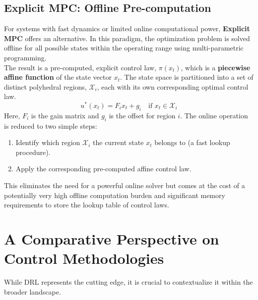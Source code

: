 \subsection{Explicit MPC: Offline Pre-computation}
For systems with fast dynamics or limited online computational power, \textbf{Explicit MPC} offers an alternative. In this paradigm, the optimization problem is solved offline for all possible states within the operating range using multi-parametric programming.
\\
\noindent
The result is a pre-computed, explicit control law, $\pi(x_t)$, which is a \textbf{piecewise affine function} of the state vector $x_t$. The state space is partitioned into a set of distinct polyhedral regions, $\mathcal{X}_i$, each with its own corresponding optimal control law.
\begin{equation}
u^*(x_t) = F_i x_t + g_i \quad \text{if } x_t \in \mathcal{X}_i
\end{equation}
Here, $F_i$ is the gain matrix and $g_i$ is the offset for region $i$. The online operation is reduced to two simple steps:
\begin{enumerate}
    \item Identify which region $\mathcal{X}_i$ the current state $x_t$ belongs to (a fast lookup procedure).
    \item Apply the corresponding pre-computed affine control law.
\end{enumerate}
This eliminates the need for a powerful online solver but comes at the cost of a potentially very high offline computation burden and significant memory requirements to store the lookup table of control laws.

\section{A Comparative Perspective on Control Methodologies}
While DRL represents the cutting edge, it is crucial to contextualize it within the broader landscape.

